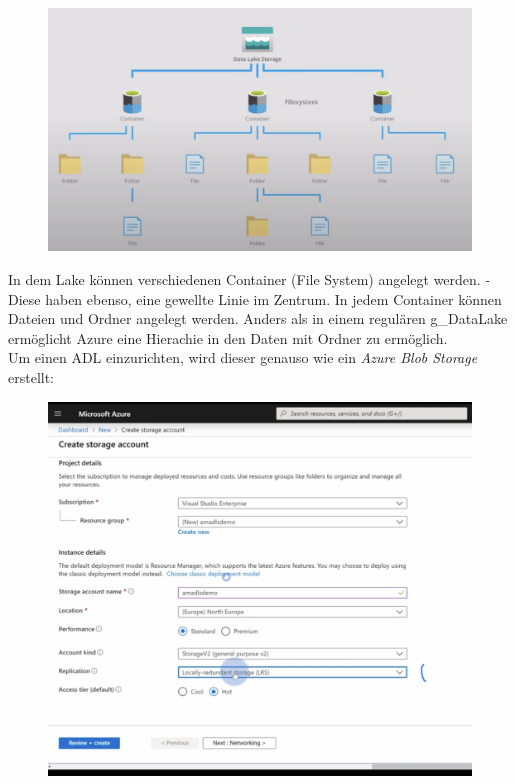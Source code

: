 \begin{figure}[H]
	\centering
	\includegraphics[scale = 0.5]{attachment/chapter_2/Scc110}
\end{figure}

In dem Lake können verschiedenen Container (File System) angelegt werden. - Diese haben ebenso, eine gewellte Linie im Zentrum. In jedem Container können Dateien und Ordner angelegt werden. Anders als in einem regulären \gls{g_DataLake} ermöglicht Azure eine Hierachie in den Daten mit Ordner zu ermöglich.\\

Um einen \gls{ADL} einzurichten, wird dieser genauso wie ein \textit{Azure Blob Storage} erstellt:

\begin{figure}[H]
	\centering
	\includegraphics[scale = 0.4]{attachment/chapter_2/Scc112}
\end{figure}


